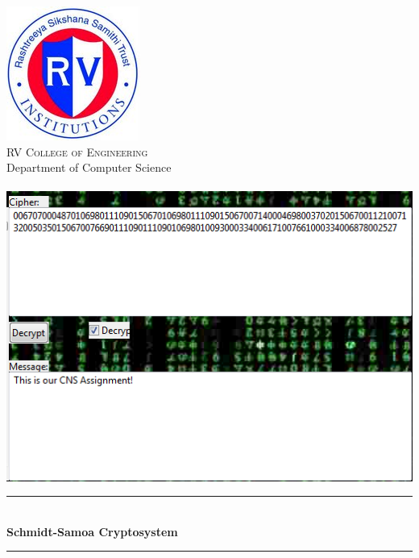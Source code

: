 \documentclass[12pt]{article} %
\newcommand{\HRule}{\rule{\linewidth}{0.5mm}}
\begin{document}
\maketitle

\begin{titlepage}

\begin{center}


\includegraphics[scale=0.75]{RVCE.png}\\[1cm]    

\textsc{\LARGE  RV College of Engineering}\\[0.5cm]
\large{Department of Computer Science}\\[1cm]
\textsc{\Large }\\[0.5cm]

\includegraphics[scale=0.75]{proj.png}\\[1cm]    

\HRule \\[0.4cm]
{  \huge\bfseries Schmidt-Samoa Cryptosystem }\\[0.4cm]

\HRule \\[1cm]


\end{center}
\end{titlepage}
\end{document}
